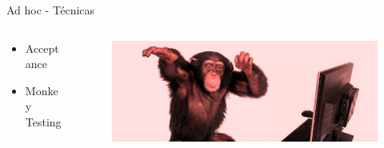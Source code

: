 \documentclass{beamer}
\begin{document}
\begin{frame}{Ad hoc - Técnicas}
\begin{columns}[T]
\begin{column}[T]{4cm}
\begin{itemize}
\item Acceptance
\item Monkey Testing
\end{itemize}
\end{column}
\begin{column}[T]{6cm} %
\begin{figure}
\centering
\includegraphics[width=\linewidth]{Images/adhoctesting.jpg}
\end{figure}
\end{column}
\end{columns}
\end{frame}
\end{document}
